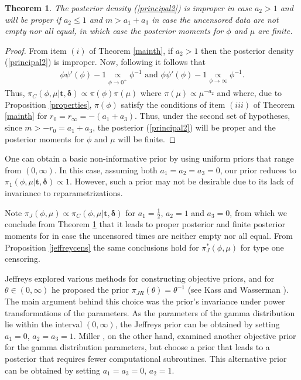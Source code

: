 \documentclass[]{interact}
\theoremstyle{plain}%
\newtheorem{theorem}{Theorem}[section]
\theoremstyle{definition}
\theoremstyle{remark}
\begin{document}
\begin{theorem}\label{principalnow} The posterior density (\ref{principal2}) is improper in case $a_2>1$ and will be proper if $a_2\leq 1$ and $m>a_1+a_3$ in case the uncensored data are not empty nor all equal, in which case the posterior moments for $\phi$ and $\mu$ are finite.
\end{theorem}
\begin{proof} From item $(i)$ of Theorem \ref{mainth}, if $a_2>1$ then the posterior density (\ref{principal2}) is improper. Now, following \cite{Pedro2020onposterior} it follows that
\begin{align*}
\phi \psi'(\phi) - 1 \underset{\phi\to 0^+}{\propto} \phi^{-1}\mbox{ and }
\phi\psi'(\phi) - 1 \underset{\phi\to \infty}{\propto} \phi^{-1}.
\end{align*}
Thus, $\pi_C(\phi,\mu|\boldsymbol{t,\delta})\propto \pi(\phi)\pi(\mu)$ where $\pi(\mu)\propto \mu^{-a_2}$ and where, due to Proposition \ref{properties}, $\pi(\phi)$ satisfy the conditions of item $(iii)$ of Theorem \ref{mainth} for $r_0=r_\infty=-(a_1+a_3)$. Thus, under the second set of hypotheses, since $m>-r_0=a_1+a_3$, the posterior (\ref{principal2}) will be proper and the posterior moments for $\phi$ and $\mu$ will be finite.
\end{proof}

One can obtain a basic non-informative prior by using uniform priors that range from $(0,\infty)$. In this case, assuming both $a_1=a_2=a_3=0$, our prior reduces to $\pi_1(\phi,\mu|\boldsymbol{t,\delta})\propto 1$. However, such a prior may not be desirable due to its lack of invariance to reparametrizations.

Note $\pi_J\left(\phi,\mu\right) \propto \pi_C(\phi,\mu|\boldsymbol{t,\delta})$ for $a_1=\frac{1}{2}$, $a_2=1$ and $a_3=0$, from which we conclude from Theorem \ref{principalnow} that it leads to proper posterior and finite posterior moments for in case the uncensored times are neither empty nor all equal. From Proposition \ref{jeffreycens} the same conclusions hold for $\pi_J^*\left(\phi,\mu\right)$ for type one censoring.


Jeffreys explored various methods for constructing objective priors, and for $\theta\in(0,\infty)$ he proposed the prior \textcolor{black}{$\pi_{JR}(\theta)=\theta^{-1}$} (see Kass and Wasserman \cite{kass1996selection}). The main argument behind this choice was the prior's invariance under power transformations of the parameters. As the parameters of the gamma distribution lie within the interval $(0,\infty)$, the Jeffreys prior can be obtained by setting $a_1=0$, $a_2=a_3=1$. Miller \cite{miller1980bayesian}, on the other hand, examined another objective prior for the gamma distribution parameters, but choose a prior that leads to a posterior that requires fewer computational subroutines. This alternative prior can be obtained by setting $a_1=a_3=0$, $a_2=1$.
\end{document}
